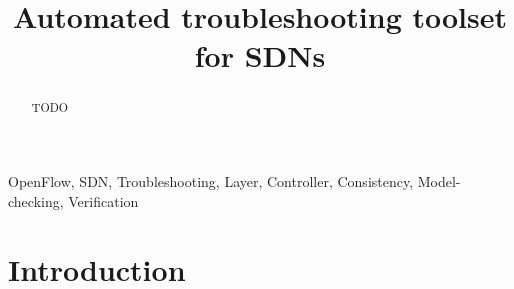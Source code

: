 \documentclass[10pt,article]{IEEEtran}
\begin{document}
\title{Automated troubleshooting toolset for SDNs}

\author{
}


\maketitle
\begin{abstract}
TODO
\end{abstract}

\begin{IEEEkeywords}
OpenFlow, SDN, Troubleshooting, Layer, Controller, Consistency, Model-checking, Verification
\end{IEEEkeywords}

\section{Introduction}
\end{document}
